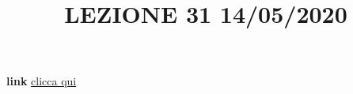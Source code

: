 \newline
\newline
\title{LEZIONE 31 14/05/2020}\newline
\textbf{link} \href{https://web.microsoftstream.com/video/17343166-1063-44d6-8693-f8900efbb2d7?list=user&userId=faa91214-a6f5-40d7-8875-253fd49b8ce1}{clicca qui}
